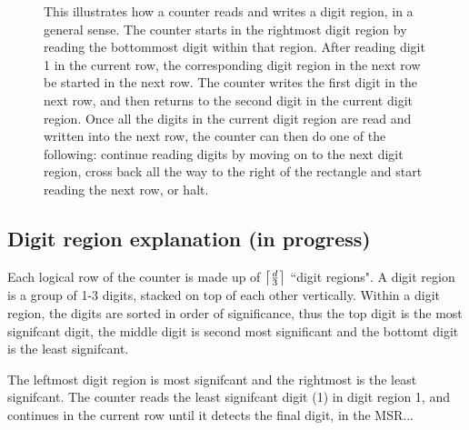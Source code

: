 \begin{figure}[H]
    \caption{\label{fig:counter_read_digit_return_read_digit_general_case3}
    This illustrates how a counter reads and writes a digit region, in a general sense.
    The counter starts in the rightmost digit region by reading the bottommost digit within
    that region. After reading digit 1 in the current row, the corresponding digit region in
    the next row be started in the next row. The counter writes the first digit in the next
    row, and then returns to the second digit in the current digit region.
    Once all the digits in the current digit region are read and written into the next row,
    the counter can then do one of the following: continue reading digits by moving on to the
    next digit region, cross back all the way to the right of the rectangle and start reading
    the next row, or halt.}
\end{figure}


\subsection{ Digit region explanation (in progress) }

Each logical row of the counter is made up of $\ceil*{\frac{d}{3}}$ ``digit regions". A digit region
is a group of 1-3 digits, stacked on top of each other vertically. Within a digit region, the digits are
sorted in order of significance, thus the top digit is the most signifcant digit,
the middle digit is second most significant and the bottomt digit is the least
signifcant.

The leftmost digit region is most signifcant and the rightmost is the least signifcant.
The counter reads the least signifcant digit (1) in digit region 1, and continues in the current row
until it detects the final digit, in the MSR...

